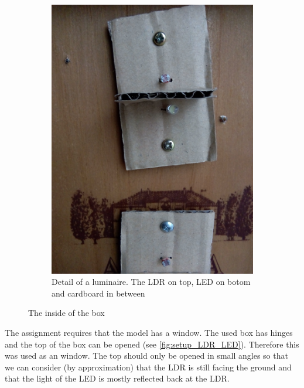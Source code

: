\begin{figure}[h]
\begin{subfigure}[t]{0.49\textwidth}
        \centering
        \includegraphics[width=\textwidth]{img/setup_LDR_LED}
        \caption{Detail of a luminaire. The LDR on top, LED on botom and cardboard in between}
        \label{fig:setup_LDR_LED}
    \end{subfigure}
    \caption{The inside of the box}
    \label{fig:setup_box_inside}
\end{figure}

The assignment requires that the model has a window. The used box has hinges and the top of the box can be opened (see \autoref{fig:setup_LDR_LED}). Therefore this was used as an window. The top should only be opened in small angles so that we can consider (by approximation) that the LDR is still facing the ground and that the light of the LED is mostly reflected back at the LDR.


